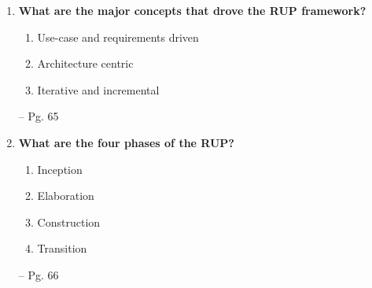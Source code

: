 \documentclass[11pt]{article}
\begin{document}
\begin{enumerate}
    \item \textbf{What are the major concepts that drove the RUP framework?}
    \begin{enumerate}
        \item Use-case and requirements driven
        \item Architecture centric
        \item Iterative and incremental
    \end{enumerate}
    -- Pg. 65
    
    \item \textbf{What are the four phases of the RUP?}
    \begin{enumerate}
        \item Inception
        \item Elaboration
        \item Construction
        \item Transition
    \end{enumerate}
    -- Pg. 66
    

\end{enumerate}
\end{document}
